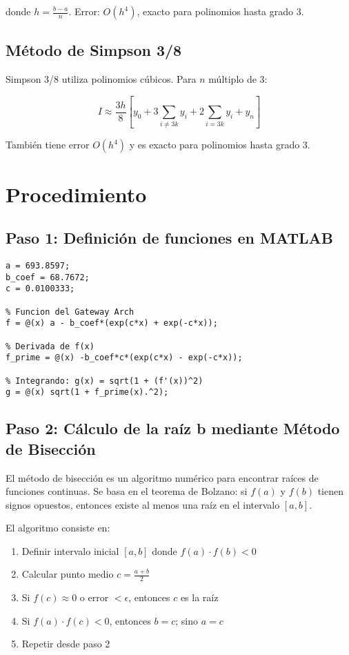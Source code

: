 \documentclass[conference]{IEEEtran}
\begin{document}
donde $h = \frac{b-a}{n}$. Error: $O(h^4)$, exacto para polinomios hasta grado 3.

\subsection{Método de Simpson 3/8}

Simpson 3/8 utiliza polinomios cúbicos. Para $n$ múltiplo de 3:

\begin{equation}
I \approx \frac{3h}{8}\left[y_0 + 3\sum_{i\neq 3k}y_i + 2\sum_{i=3k}y_i + y_n\right]
\end{equation}

También tiene error $O(h^4)$ y es exacto para polinomios hasta grado 3.

\section{Procedimiento}

\subsection{Paso 1: Definición de funciones en MATLAB}

\begin{lstlisting}[caption={Definición de constantes y funciones}]
% Constantes del Gateway Arch
a = 693.8597;
b_coef = 68.7672;
c = 0.0100333;

% Funcion del Gateway Arch
f = @(x) a - b_coef*(exp(c*x) + exp(-c*x));

% Derivada de f(x)
f_prime = @(x) -b_coef*c*(exp(c*x) - exp(-c*x));

% Integrando: g(x) = sqrt(1 + (f'(x))^2)
g = @(x) sqrt(1 + f_prime(x).^2);
\end{lstlisting}

\subsection{Paso 2: Cálculo de la raíz b mediante Método de Bisección}

El método de bisección es un algoritmo numérico para encontrar raíces de funciones continuas. Se basa en el teorema de Bolzano: si $f(a)$ y $f(b)$ tienen signos opuestos, entonces existe al menos una raíz en el intervalo $[a,b]$.

El algoritmo consiste en:
\begin{enumerate}
    \item Definir intervalo inicial $[a, b]$ donde $f(a) \cdot f(b) < 0$
    \item Calcular punto medio $c = \frac{a+b}{2}$
    \item Si $f(c) \approx 0$ o error $< \epsilon$, entonces $c$ es la raíz
    \item Si $f(a) \cdot f(c) < 0$, entonces $b = c$; sino $a = c$
    \item Repetir desde paso 2
\end{enumerate}
\end{document}
